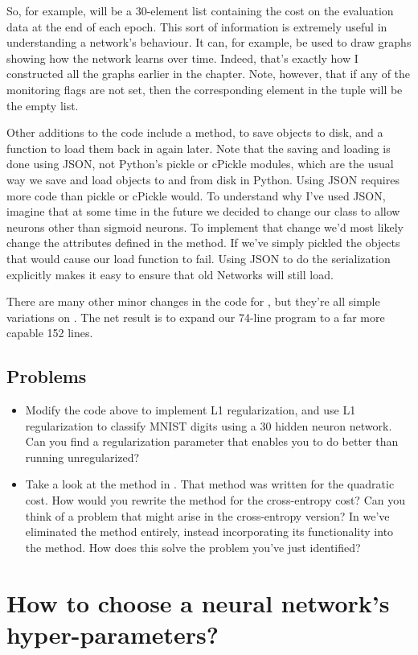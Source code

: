 \documentclass[a4paper,twoside,10pt]{book}
\begin{document}
So, for example,  will be a 30-element list containing the cost on the evaluation data at the end of each epoch. This sort of information is extremely useful in understanding a network's behaviour. It can, for example, be used to draw graphs showing how the network learns over time. Indeed, that's exactly how I constructed all the graphs earlier in the chapter. Note, however, that if any of the monitoring flags are not set, then the corresponding element in the tuple will be the empty list.

Other additions to the code include a  method, to save  objects to disk, and a function to load them back in again later. Note that the saving and loading is done using JSON, not Python's pickle or cPickle modules, which are the usual way we save and load objects to and from disk in Python. Using JSON requires more code than pickle or cPickle would. To understand why I've used JSON, imagine that at some time in the future we decided to change our  class to allow neurons other than sigmoid neurons. To implement that change we'd most likely change the attributes defined in the  method. If we've simply pickled the objects that would cause our load function to fail. Using JSON to do the serialization explicitly makes it easy to ensure that old Networks will still load.

There are many other minor changes in the code for , but they're all simple variations on . The net result is to expand our 74-line program to a far more capable 152 lines.

\subsection*{Problems}
\begin{itemize}
\item Modify the code above to implement L1 regularization, and use L1 regularization to classify MNIST digits using a 30 hidden neuron network. Can you find a regularization parameter that enables you to do better than running unregularized?
\item Take a look at the  method in . That method was written for the quadratic cost. How would you rewrite the method for the cross-entropy cost? Can you think of a problem that might arise in the cross-entropy version? In  we've eliminated the  method entirely, instead incorporating its functionality into the  method. How does this solve the problem you've just identified?
\end{itemize}
\section{How to choose a neural network's hyper-parameters?}
\end{document}
